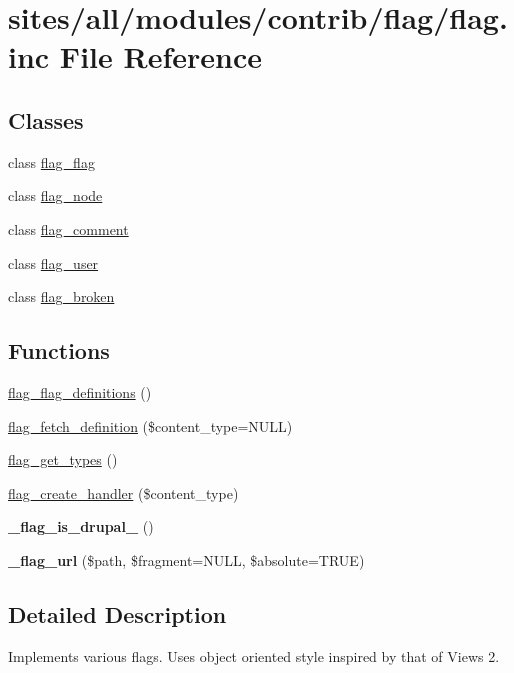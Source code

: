 \hypertarget{flag_8inc}{
\section{sites/all/modules/contrib/flag/flag.inc File Reference}
\label{flag_8inc}
}
\subsection*{Classes}
\begin{CompactItemize}
\item 
class \hyperlink{classflag__flag}{flag\_\-flag}
\item 
class \hyperlink{classflag__node}{flag\_\-node}
\item 
class \hyperlink{classflag__comment}{flag\_\-comment}
\item 
class \hyperlink{classflag__user}{flag\_\-user}
\item 
class \hyperlink{classflag__broken}{flag\_\-broken}
\end{CompactItemize}
\subsection*{Functions}
\begin{CompactItemize}
\item 
\hyperlink{flag_8inc_7dca6c37b1fef3d06a063a2e3b0105d9}{flag\_\-flag\_\-definitions} ()
\item 
\hyperlink{flag_8inc_de183158b0c6693a4ddd93443524813a}{flag\_\-fetch\_\-definition} (\$content\_\-type=NULL)
\item 
\hyperlink{flag_8inc_9c51bca58c6862b4c48420cadc932265}{flag\_\-get\_\-types} ()
\item 
\hyperlink{flag_8inc_0e5203bf1b4aeac5a5a59ee9916f90f0}{flag\_\-create\_\-handler} (\$content\_\-type)
\item 
\hypertarget{flag_8inc_6a54702139f5c214801ea54849d07513}{
\textbf{\_\-flag\_\-is\_\-drupal\_} ()}
\label{flag_8inc_6a54702139f5c214801ea54849d07513}

\item 
\hypertarget{flag_8inc_b385626fff1779a71bbd8b702c9a1cb3}{
\textbf{\_\-flag\_\-url} (\$path, \$fragment=NULL, \$absolute=TRUE)}
\label{flag_8inc_b385626fff1779a71bbd8b702c9a1cb3}

\end{CompactItemize}


\subsection{Detailed Description}
Implements various flags. Uses object oriented style inspired by that of Views 2. 

